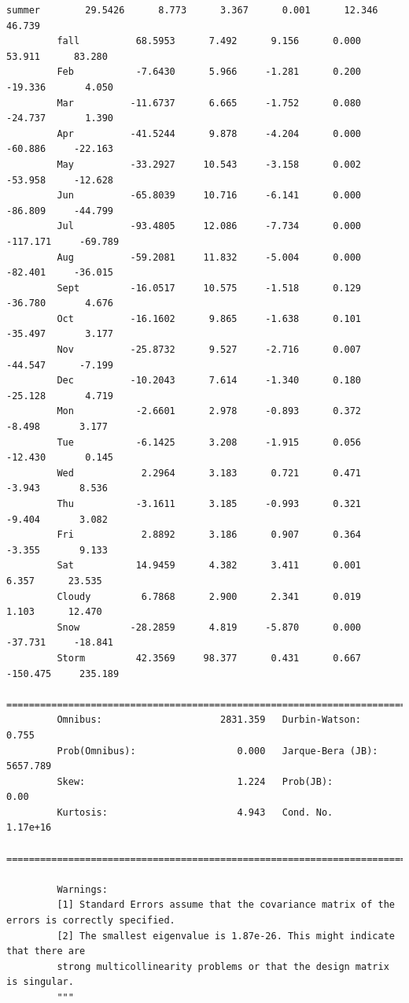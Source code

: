 \documentclass[11pt]{article}
\begin{document}
\begin{Verbatim}[commandchars=\\\{\}]
         summer        29.5426      8.773      3.367      0.001      12.346      46.739
         fall          68.5953      7.492      9.156      0.000      53.911      83.280
         Feb           -7.6430      5.966     -1.281      0.200     -19.336       4.050
         Mar          -11.6737      6.665     -1.752      0.080     -24.737       1.390
         Apr          -41.5244      9.878     -4.204      0.000     -60.886     -22.163
         May          -33.2927     10.543     -3.158      0.002     -53.958     -12.628
         Jun          -65.8039     10.716     -6.141      0.000     -86.809     -44.799
         Jul          -93.4805     12.086     -7.734      0.000    -117.171     -69.789
         Aug          -59.2081     11.832     -5.004      0.000     -82.401     -36.015
         Sept         -16.0517     10.575     -1.518      0.129     -36.780       4.676
         Oct          -16.1602      9.865     -1.638      0.101     -35.497       3.177
         Nov          -25.8732      9.527     -2.716      0.007     -44.547      -7.199
         Dec          -10.2043      7.614     -1.340      0.180     -25.128       4.719
         Mon           -2.6601      2.978     -0.893      0.372      -8.498       3.177
         Tue           -6.1425      3.208     -1.915      0.056     -12.430       0.145
         Wed            2.2964      3.183      0.721      0.471      -3.943       8.536
         Thu           -3.1611      3.185     -0.993      0.321      -9.404       3.082
         Fri            2.8892      3.186      0.907      0.364      -3.355       9.133
         Sat           14.9459      4.382      3.411      0.001       6.357      23.535
         Cloudy         6.7868      2.900      2.341      0.019       1.103      12.470
         Snow         -28.2859      4.819     -5.870      0.000     -37.731     -18.841
         Storm         42.3569     98.377      0.431      0.667    -150.475     235.189
         ==============================================================================
         Omnibus:                     2831.359   Durbin-Watson:                   0.755
         Prob(Omnibus):                  0.000   Jarque-Bera (JB):             5657.789
         Skew:                           1.224   Prob(JB):                         0.00
         Kurtosis:                       4.943   Cond. No.                     1.17e+16
         ==============================================================================
         
         Warnings:
         [1] Standard Errors assume that the covariance matrix of the errors is correctly specified.
         [2] The smallest eigenvalue is 1.87e-26. This might indicate that there are
         strong multicollinearity problems or that the design matrix is singular.
         """
\end{Verbatim}
            
\end{document}
